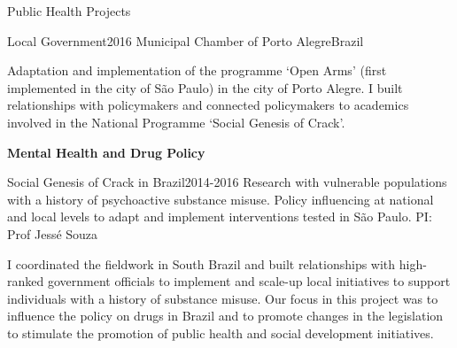 \begin{rSection}{Public Health Projects}
\begin{etaremune}
\begin{rSubsection}
{Local Government}{2016}
{Municipal Chamber of Porto Alegre}{Brazil}\par
{Adaptation and implementation of the programme `Open Arms' (first implemented in the city of São Paulo) in the city of Porto Alegre. I built relationships with policymakers and connected policymakers to academics involved in the National Programme `Social Genesis of Crack'.}
\end{rSubsection}

\vspace{1em}

\item  \textbf{Mental Health and Drug Policy}\par

\begin{rSubsection}
{Social Genesis of Crack in Brazil}{2014-2016}
{Research with vulnerable populations with a history of psychoactive substance misuse. Policy influencing at national and local levels to adapt and implement interventions tested in São Paulo. PI: Prof Jessé Souza}\par
{I coordinated the fieldwork in South Brazil and built relationships with high-ranked government officials to implement and scale-up local initiatives to support individuals with a history of substance misuse. Our focus in this project was to influence the policy on drugs in Brazil and to promote changes in the legislation to stimulate the promotion of public health and social development initiatives.}
\end{rSubsection}

\vspace{1em}

\end{etaremune}

\end{rSection}